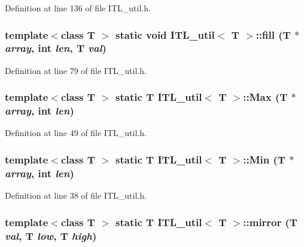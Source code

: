 Definition at line 136 of file ITL\_\-util.h.

\hypertarget{classITL__util_aa99e2c6682db5444c25bacf428d6d1b9}{
\subsubsection[{fill}]{\setlength{\rightskip}{0pt plus 5cm}template$<$class T $>$ static void {\bf ITL\_\-util}$<$ T $>$::fill (T $\ast$ {\em array}, \/  int {\em len}, \/  T {\em val})}}
\label{classITL__util_aa99e2c6682db5444c25bacf428d6d1b9}


Definition at line 79 of file ITL\_\-util.h.

\hypertarget{classITL__util_a162025a233f6ec9ca5bf9218390e8ad3}{
\subsubsection[{Max}]{\setlength{\rightskip}{0pt plus 5cm}template$<$class T $>$ static T {\bf ITL\_\-util}$<$ T $>$::Max (T $\ast$ {\em array}, \/  int {\em len})}}
\label{classITL__util_a162025a233f6ec9ca5bf9218390e8ad3}


Definition at line 49 of file ITL\_\-util.h.

\hypertarget{classITL__util_a0ae10172a5e09f46ff2d280d1f1d41b0}{
\subsubsection[{Min}]{\setlength{\rightskip}{0pt plus 5cm}template$<$class T $>$ static T {\bf ITL\_\-util}$<$ T $>$::Min (T $\ast$ {\em array}, \/  int {\em len})}}
\label{classITL__util_a0ae10172a5e09f46ff2d280d1f1d41b0}


Definition at line 38 of file ITL\_\-util.h.

\hypertarget{classITL__util_af15f3ba814e5e45277141747f9e16133}{
\subsubsection[{mirror}]{\setlength{\rightskip}{0pt plus 5cm}template$<$class T $>$ static T {\bf ITL\_\-util}$<$ T $>$::mirror (T {\em val}, \/  T {\em low}, \/  T {\em high})}}
\label{classITL__util_af15f3ba814e5e45277141747f9e16133}


